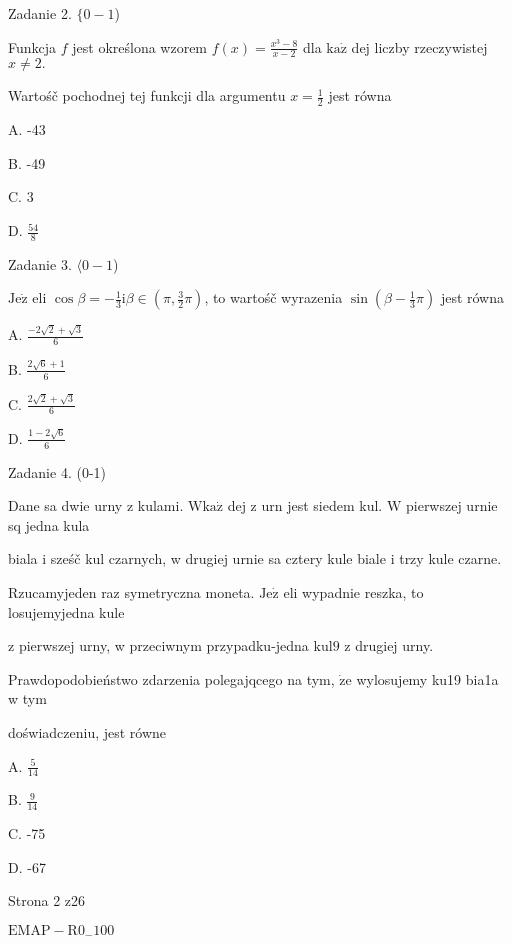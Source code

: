 \documentclass[a4paper,12pt]{article}
\begin{document}
Zadanie 2. $\{0-1$)

Funkcja $f$ jest określona wzorem $f(x)=\displaystyle \frac{x^{3}-8}{x-2}$ dla $\mathrm{k}\mathrm{a}\dot{\mathrm{z}}$ dej liczby rzeczywistej $x\neq 2.$

Wartośč pochodnej tej funkcji dla argumentu $x=\displaystyle \frac{1}{2}$ jest równa

A. -43

B. -49

C. 3

D. $\displaystyle \frac{54}{8}$

Zadanie 3. $\langle 0-1$)

$\mathrm{J}\mathrm{e}\dot{\mathrm{z}}$ eli $\displaystyle \cos\beta=-\frac{1}{3} \mathrm{i} \displaystyle \beta\in(\pi,\frac{3}{2}\pi)$, to wartośč wyrazenia $\displaystyle \sin(\beta-\frac{1}{3}\pi)$ jest równa

A. $\displaystyle \frac{-2\sqrt{2}+\sqrt{3}}{6}$

B. $\displaystyle \frac{2\sqrt{6}+1}{6}$

C. $\displaystyle \frac{2\sqrt{2}+\sqrt{3}}{6}$

D. $\displaystyle \frac{1-2\sqrt{6}}{6}$

Zadanie 4. (0-1)

Dane sa dwie urny z kulami. $\mathrm{W}\mathrm{k}\mathrm{a}\dot{\mathrm{z}}$ dej z urn jest siedem kul. $\mathrm{W}$ pierwszej urnie sq jedna kula

biala i sześč kul czarnych, w drugiej urnie sa cztery kule biale i trzy kule czarne.

Rzucamyjeden raz symetryczna moneta. $\mathrm{J}\mathrm{e}\dot{\mathrm{z}}$ eli wypadnie reszka, to losujemyjedna kule

z pierwszej urny, w przeciwnym przypadku-jedna $\mathrm{k}\mathrm{u}\mathrm{l}9$ z drugiej urny.

Prawdopodobieństwo zdarzenia polegajqcego na tym, $\dot{\mathrm{z}}\mathrm{e}$ wylosujemy ku19 bia1a w tym

doświadczeniu, jest równe

A. $\displaystyle \frac{5}{14}$

B. $\displaystyle \frac{9}{14}$

C. -75

D. -67

Strona 2 z26

$\mathrm{E}\mathrm{M}\mathrm{A}\mathrm{P}-\mathrm{R}0_{-}100$
\end{document}
